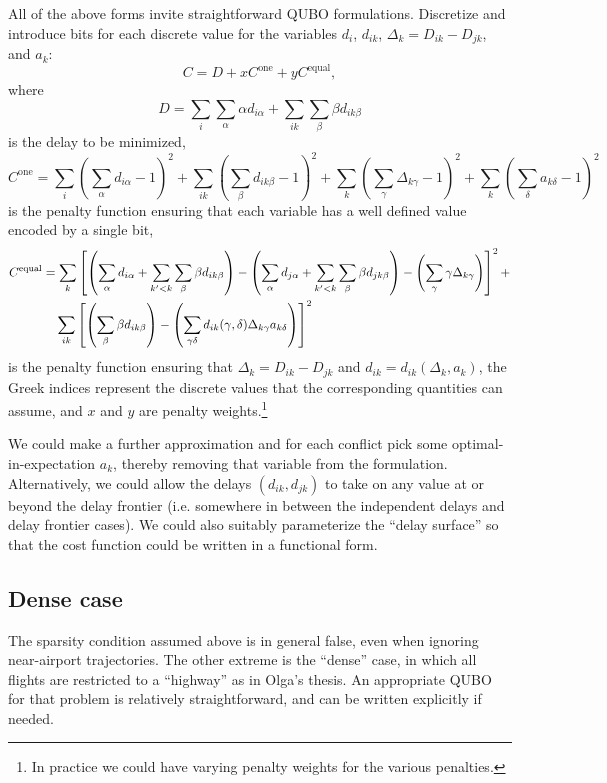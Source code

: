 \documentclass{article}
\begin{document}
All of the above forms invite straightforward QUBO formulations.
Discretize and introduce bits for each discrete value for the variables $d_i$, $d_{ik}$, $\Delta_k = D_{ik} - D_{jk}$, and $a_k$:
\begin{equation*}
    C = D + x C^{\mathrm{one}} + y C^{\mathrm{equal}},
\end{equation*}
where 
\begin{equation*}
D = 
\sum_{i} \sum_{\alpha} \alpha d_{i\alpha}
+
\sum_{ik} \sum_{\beta} \beta d_{ik\beta}
\end{equation*}
is the delay to be minimized,
\begin{equation*}
C^{\mathrm{one}}
=
\sum_i \left(\sum_{\alpha} d_{i\alpha}- 1 \right)^2 
+
\sum_{ik} \left(\sum_{\beta} d_{ik\beta} - 1\right)^2
+
\sum_{k} \left(\sum_{\gamma} \Delta_{k\gamma} - 1\right)^2
+
\sum_{k} \left(\sum_{\delta} a_{k\delta}- 1\right)^2
\end{equation*}
is the penalty function ensuring that each variable has a well defined value encoded by a single bit,
\begin{align*}
C^{\mathrm{equal}}
&=
\sum_{k} \left[
\left(\sum_{\alpha} d_{i\alpha} + \sum_{k' < k} \sum_{\beta} \beta d_{ik\beta}\right)
-
\left(\sum_{\alpha} d_{j\alpha} + \sum_{k' < k} \sum_{\beta} \beta d_{jk\beta}\right)
-
\left(\sum_{\gamma} \gamma \Delta_{k\gamma}\right)\right]^2
+ \\
&\hphantom{=,}
\sum_{ik} \left[
    \left(\sum_{\beta} \beta d_{ik\beta}\right) - 
\left(\sum_{\gamma \delta} d_{ik} (\gamma, \delta) \Delta_{k\gamma} a_{k\delta}\right)\right]^2
\end{align*}
is the penalty function ensuring that $\Delta_k = D_{ik} - D_{jk}$ and $d_{ik} = d_{ik}(\Delta_k, a_k)$, 
the Greek indices represent the discrete values that the corresponding quantities can assume, and $x$ and $y$ are penalty weights.\footnote{In practice we could have varying penalty weights for the various penalties.}

We could make a further approximation and for each conflict pick some optimal-in-expectation $a_k$, thereby removing that variable from the formulation.
Alternatively, we could allow the delays $(d_{ik}, d_{jk})$ to take on any value at or beyond the delay frontier (i.e. somewhere in between the independent delays and delay frontier cases).
We could also suitably parameterize the ``delay surface'' so that the cost function could be written in a functional form.

\subsection{Dense case}
The sparsity condition assumed above is in general false, even when ignoring near-airport trajectories.
The other extreme is the ``dense'' case, in which all flights are restricted to a ``highway'' as in Olga's thesis.
An appropriate QUBO for that problem is relatively straightforward, and can be written explicitly if needed.
\end{document}
